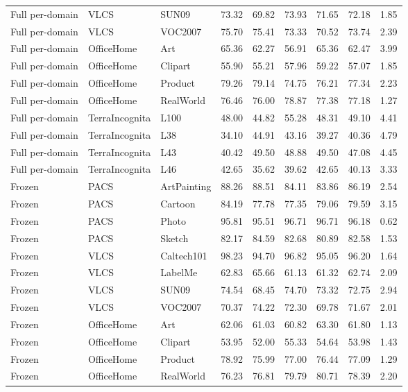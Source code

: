 \begin{longtable}{lllrrrrrr}
Full per-domain & VLCS & SUN09 & 73.32 & 69.82 & 73.93 & 71.65 & 72.18 & 1.85 \\
Full per-domain & VLCS & VOC2007 & 75.70 & 75.41 & 73.33 & 70.52 & 73.74 & 2.39 \\
Full per-domain & OfficeHome & Art & 65.36 & 62.27 & 56.91 & 65.36 & 62.47 & 3.99 \\
Full per-domain & OfficeHome & Clipart & 55.90 & 55.21 & 57.96 & 59.22 & 57.07 & 1.85 \\
Full per-domain & OfficeHome & Product & 79.26 & 79.14 & 74.75 & 76.21 & 77.34 & 2.23 \\
Full per-domain & OfficeHome & RealWorld & 76.46 & 76.00 & 78.87 & 77.38 & 77.18 & 1.27 \\
Full per-domain & TerraIncognita & L100 & 48.00 & 44.82 & 55.28 & 48.31 & 49.10 & 4.41 \\
Full per-domain & TerraIncognita & L38 & 34.10 & 44.91 & 43.16 & 39.27 & 40.36 & 4.79 \\
Full per-domain & TerraIncognita & L43 & 40.42 & 49.50 & 48.88 & 49.50 & 47.08 & 4.45 \\
Full per-domain & TerraIncognita & L46 & 42.65 & 35.62 & 39.62 & 42.65 & 40.13 & 3.33 \\
Frozen & PACS & ArtPainting & 88.26 & 88.51 & 84.11 & 83.86 & 86.19 & 2.54 \\
Frozen & PACS & Cartoon & 84.19 & 77.78 & 77.35 & 79.06 & 79.59 & 3.15 \\
Frozen & PACS & Photo & 95.81 & 95.51 & 96.71 & 96.71 & 96.18 & 0.62 \\
Frozen & PACS & Sketch & 82.17 & 84.59 & 82.68 & 80.89 & 82.58 & 1.53 \\
Frozen & VLCS & Caltech101 & 98.23 & 94.70 & 96.82 & 95.05 & 96.20 & 1.64 \\
Frozen & VLCS & LabelMe & 62.83 & 65.66 & 61.13 & 61.32 & 62.74 & 2.09 \\
Frozen & VLCS & SUN09 & 74.54 & 68.45 & 74.70 & 73.32 & 72.75 & 2.94 \\
Frozen & VLCS & VOC2007 & 70.37 & 74.22 & 72.30 & 69.78 & 71.67 & 2.01 \\
Frozen & OfficeHome & Art & 62.06 & 61.03 & 60.82 & 63.30 & 61.80 & 1.13 \\
Frozen & OfficeHome & Clipart & 53.95 & 52.00 & 55.33 & 54.64 & 53.98 & 1.43 \\
Frozen & OfficeHome & Product & 78.92 & 75.99 & 77.00 & 76.44 & 77.09 & 1.29 \\
Frozen & OfficeHome & RealWorld & 76.23 & 76.81 & 79.79 & 80.71 & 78.39 & 2.20 \\

\end{longtable}
